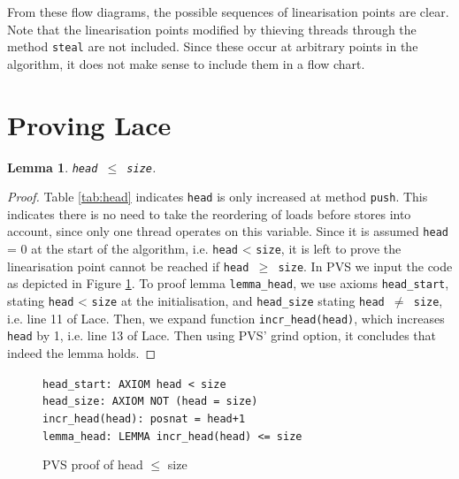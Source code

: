 \documentclass{sig-alternate-br}
\newtheorem{lemma}{Lemma}
\begin{document}
From these flow diagrams, the possible sequences of linearisation points are clear.
Note that the linearisation points modified by thieving threads through the method \texttt{steal} are not included.
Since these occur at arbitrary points in the algorithm, it does not make sense to include them in a flow chart.

\section{Proving Lace}
\begin{lemma}
	\texttt{head $\leq$ size}.
	\label{lem:headsize}
\end{lemma}
\begin{proof}
	Table \ref{tab:head} indicates \texttt{head} is only increased at method \texttt{push}.
	This indicates there is no need to take the reordering of loads before stores into account, since only one thread operates on this variable.
	Since it is assumed \texttt{head} = 0 at the start of the algorithm, i.e. \texttt{head} < \texttt{size}, it is left to prove the linearisation point cannot be reached if \texttt{head $\geq$ size}.
	In PVS we input the code as depicted in Figure \ref{pvs:head}.
	To proof lemma \texttt{lemma\_head}, we use axioms \texttt{head\_start}, stating \texttt{head} < \texttt{size} at the initialisation, and \texttt{head\_size} stating \texttt{head $\neq$ size}, i.e. line 11 of Lace.
	Then, we expand function \texttt{incr\_head(head)}, which increases \texttt{head} by 1, i.e. line 13 of Lace.
	Then using PVS' grind option, it concludes that indeed the lemma holds.
\end{proof}
\begin{figure}[h]
	\texttt{head\_start: AXIOM head < size}\\
	\texttt{head\_size: AXIOM NOT (head = size)}\\
	\texttt{incr\_head(head): posnat = head+1}\\
	\texttt{lemma\_head: LEMMA incr\_head(head) <= size}
	\caption{PVS proof of head $\leq$ size}
	\label{pvs:head}
\end{figure}
\end{document}
